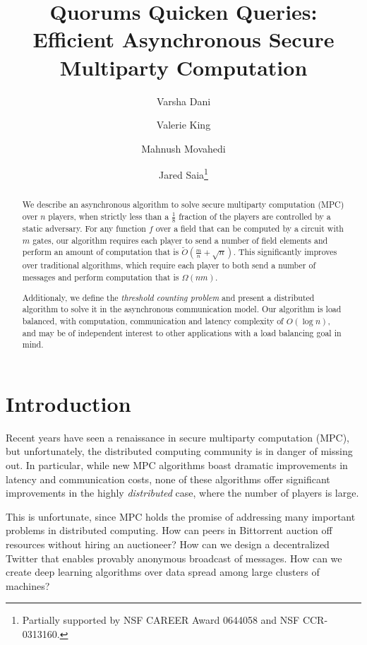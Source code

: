 \documentclass[10pt]{llncs}
\newcommand{\fbad}{\frac18\xspace}
\begin{document}
\title{Quorums Quicken Queries: Efficient Asynchronous Secure Multiparty Computation}
\author{
Varsha Dani
\and Valerie King 
\and Mahnush Movahedi
\and Jared Saia\thanks{Partially supported by NSF
CAREER Award 0644058 and NSF CCR-0313160.}
}
\maketitle







\begin{abstract}
We describe an asynchronous algorithm to solve secure multiparty
computation (MPC) over $n$ players, when strictly less than a $\fbad$
fraction of the players are controlled by a static adversary.  For any
function $f$ over a field that can be computed by a circuit with $m$ gates, our
algorithm requires each player to send a number of field elements and perform an
amount of computation that is $\tilde{O}(\frac{m}{n} + \sqrt n)$. This
significantly improves over traditional algorithms, which require each
player to both send a number of messages and perform computation that
is $\Omega(nm)$.

Additionaly, we define the \emph{threshold counting problem} and
present a distributed algorithm to solve it in the asynchronous
communication model.  Our algorithm is load balanced, with
computation, communication and latency complexity of $O(\log{n})$, and
may be of independent interest to other applications with a load
balancing goal in mind.
\end{abstract}

\section{Introduction}


Recent years have seen a renaissance in secure multiparty computation (MPC), but unfortunately, the distributed computing community is in danger of missing out.  In particular,  while new MPC algorithms boast dramatic improvements in latency and communication costs, none of these algorithms offer significant improvements in the highly \emph{distributed} case, where the number of players is large.  

This is unfortunate, since MPC holds the promise of addressing many important problems in distributed computing. How can peers in Bittorrent auction off resources without hiring an auctioneer?  How can we design a decentralized Twitter that enables provably anonymous broadcast of messages.  How can we create deep learning algorithms over data spread among large clusters of machines?
\end{document}
